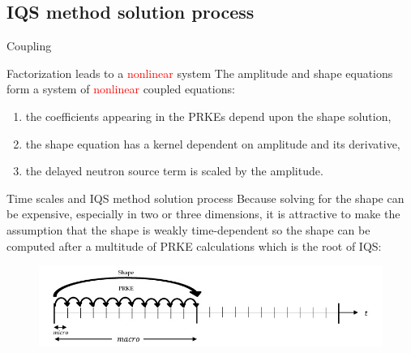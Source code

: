 \documentclass[8pt]{beamer}
\newcommand{\ben}{\begin{enumerate}}
\newcommand{\een}{\end{enumerate}}
\newcommand{\tcr}[1]{\textcolor{red}{#1}}
\begin{document}
\subsection{IQS method solution process}

\begin{frame}{Coupling}

\begin{block}{Factorization leads to a \tcr{nonlinear} system}
The amplitude and shape equations form a system of \tcr{nonlinear} coupled equations: 
\ben
\item the coefficients appearing in the PRKEs depend upon the shape solution,
\item the shape equation has a kernel dependent on amplitude and its derivative,  
\item the delayed neutron source term is scaled by the amplitude.
\een
\end{block}

\begin{block}{Time scales and IQS method solution process}
Because solving for the shape can be expensive, especially in two or three dimensions, it is attractive to make the assumption that the shape is weakly time-dependent so the shape can be computed after a multitude of PRKE calculations which is the root of IQS: 
%

\begin{figure}[h]
\includegraphics[width=\linewidth]{figures/IQS_visualization.jpg}
\label{fig:IQS}
\end{figure}

\end{block}
\end{frame}
\end{document}
